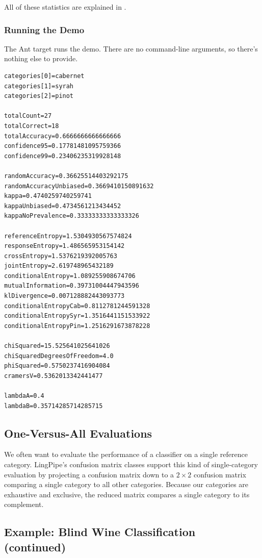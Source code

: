 All of these statistics are explained in .


\subsubsection{Running the Demo}

The Ant target  runs the demo.  There are no command-line
arguments, so there's nothing else to provide.  
%
\begin{verbatim}
categories[0]=cabernet
categories[1]=syrah
categories[2]=pinot

totalCount=27
totalCorrect=18
totalAccuracy=0.6666666666666666
confidence95=0.17781481095759366
confidence99=0.23406235319928148

randomAccuracy=0.36625514403292175
randomAccuracyUnbiased=0.3669410150891632
kappa=0.4740259740259741
kappaUnbiased=0.4734561213434452
kappaNoPrevalence=0.33333333333333326

referenceEntropy=1.5304930567574824
responseEntropy=1.486565953154142
crossEntropy=1.5376219392005763
jointEntropy=2.619748965432189
conditionalEntropy=1.089255908674706
mutualInformation=0.39731004447943596
klDivergence=0.007128882443093773
conditionalEntropyCab=0.8112781244591328
conditionalEntropySyr=1.3516441151533922
conditionalEntropyPin=1.2516291673878228

chiSquared=15.525641025641026
chiSquaredDegreesOfFreedom=4.0
phiSquared=0.5750237416904084
cramersV=0.5362013342441477

lambdaA=0.4
lambdaB=0.35714285714285715
\end{verbatim}


\subsection{One-Versus-All Evaluations}\label{section:classifier-eval-one-versus-all}

We often want to evaluate the performance of a classifier on a single
reference category.  LingPipe's confusion matrix classes support this
kind of single-category evaluation by projecting a confusion matrix
down to a $2 \times 2$ confusion matrix comparing a single category to
all other categories.  Because our categories are exhaustive and
exclusive, the reduced matrix compares a single category to its
complement.

\subsection{Example: Blind Wine Classification (continued)}

